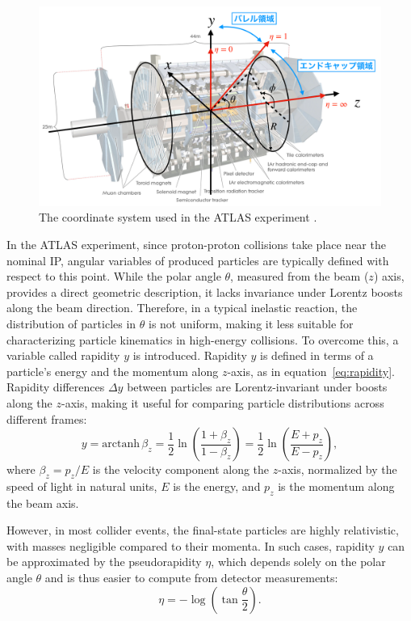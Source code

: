 \begin{figure}[htbp]
  \centering
  \includegraphics[width=1.0\textwidth]{figs/chapter2/ATLAS_coordinate.png}
  \caption{The coordinate system used in the ATLAS experiment \cite{mino}.}
  \label{fig:ATLASCoordinate}
\end{figure}

In the ATLAS experiment, since proton-proton collisions take place near the nominal IP, angular variables of produced particles are typically defined with respect to this point. While the polar angle \(\theta\), measured from the beam (\(z\)) axis, provides a direct geometric description, it lacks invariance under Lorentz boosts along the beam direction. Therefore, in a typical inelastic reaction, the distribution of particles in \(\theta\) is not uniform, making it less suitable for characterizing particle kinematics in high-energy collisions.
To overcome this, a variable called rapidity \(y\) is introduced. Rapidity \(y\) is defined in terms of a particle's energy and the momentum along \(z\)-axis, as in equation~\ref{eq:rapidity}. Rapidity differences \(\Delta y\) between particles are Lorentz-invariant under boosts along the \(z\)-axis, making it useful for comparing particle distributions across different frames:
\begin{equation}
  y = \mathrm{arctanh}\, \beta_z 
    = \frac{1}{2} \ln \left( \frac{1 + \beta_z}{1 - \beta_z} \right)
    = \frac{1}{2} \ln \left( \frac{E + p_z}{E - p_z} \right),
  \label{eq:rapidity}
\end{equation}
where \(\beta_z = p_z/E\) is the velocity component along the \(z\)-axis, normalized by the speed of light in natural units, \(E\) is the energy, and \(p_z\) is the momentum along the beam axis.

However, in most collider events, the final-state particles are highly relativistic, with masses negligible compared to their momenta. In such cases, rapidity \(y\) can be approximated by the pseudorapidity \(\eta\), which depends solely on the polar angle \(\theta\) and is thus easier to compute from detector measurements:
\begin{equation}
  \eta = -\log\left( \tan \frac{\theta}{2} \right).
  \label{eq:pseudorapidity}
\end{equation}

